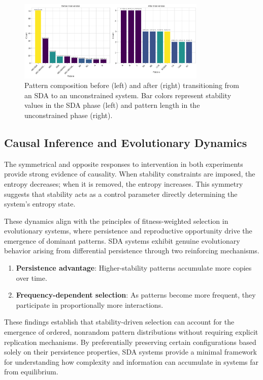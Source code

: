 \documentclass[preprint,12pt]{elsarticle}
\begin{document}
\begin{figure}[h]
    \centering
    \includegraphics[width=0.8\textwidth]{figure_9.png}
    \caption{Pattern composition before (left) and after (right) transitioning from an SDA to an unconstrained system. Bar colors represent stability values in the SDA phase (left) and pattern length in the unconstrained phase (right).}
    \label{fig:s2u-patterns}
\end{figure}

\subsection{Causal Inference and Evolutionary Dynamics}

The symmetrical and opposite responses to intervention in both experiments provide strong evidence of causality. When stability constraints are imposed, the entropy decreases; when it is removed, the entropy increases. This symmetry suggests that stability acts as a control parameter directly determining the system's entropy state.

These dynamics align with the principles of fitness-weighted selection in evolutionary systems, where persistence and reproductive opportunity drive the emergence of dominant patterns. SDA systems exhibit genuine evolutionary behavior arising from differential persistence through two reinforcing mechanisms.
\begin{enumerate}
    \item \textbf{Persistence advantage}: Higher-stability patterns accumulate more copies over time.
    \item \textbf{Frequency-dependent selection}: As patterns become more frequent, they participate in proportionally more interactions.
\end{enumerate}

These findings establish that stability-driven selection can account for the emergence of ordered, nonrandom pattern distributions without requiring explicit replication mechanisms. By preferentially preserving certain configurations based solely on their persistence properties, SDA systems provide a minimal framework for understanding how complexity and information can accumulate in systems far from equilibrium.
\end{document}
